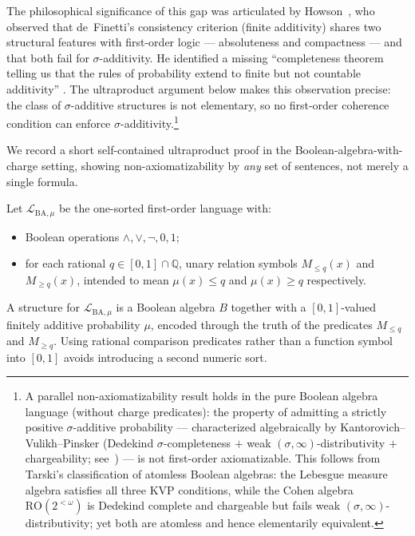 \documentclass[11pt]{article}
\theoremstyle{definition}
\newcommand{\Lmu}{\mathcal{L}_{\mathrm{BA},\mu}}
\begin{document}
The philosophical significance of this gap was articulated by
Howson~\cite{Howson2008}, who observed that de~Finetti's consistency criterion
(finite additivity) shares two structural features with first-order
logic --- absoluteness and compactness --- and that both fail for
$\sigma$-additivity.  He identified a missing ``completeness theorem telling us
that the rules of probability extend to finite but not countable additivity''
\cite[p.~17]{Howson2008}.  The ultraproduct argument below makes this
observation precise: the class of $\sigma$-additive structures is not
elementary, so no first-order coherence condition can enforce
$\sigma$-additivity.\footnote{A parallel non-axiomatizability result holds in the
pure Boolean algebra language (without charge predicates): the property of
admitting a strictly positive $\sigma$-additive probability --- characterized
algebraically by Kantorovich--Vulikh--Pinsker (Dedekind $\sigma$-completeness $+$
weak $(\sigma,\infty)$-distributivity $+$ chargeability;
see~\cite[391D]{Fremlin3}) --- is not first-order axiomatizable.  This follows
from Tarski's classification of atomless Boolean algebras: the Lebesgue measure
algebra satisfies all three KVP conditions, while the Cohen algebra
$\mathrm{RO}(2^{<\omega})$ is Dedekind complete and chargeable but fails weak
$(\sigma,\infty)$-distributivity; yet both are atomless and hence elementarily
equivalent.}

We record a short self-contained ultraproduct proof in the
Boolean-algebra-with-charge setting, showing non-axiomatizability by \emph{any}
set of sentences, not merely a single formula.

\medskip

Let $\Lmu$ be the one-sorted first-order language with:
\begin{itemize}
  \item Boolean operations $\wedge, \vee, \neg, 0, 1$;
  \item for each rational $q \in [0,1] \cap \mathbb{Q}$, unary relation symbols
        $M_{\leq q}(x)$ and $M_{\geq q}(x)$, intended to mean
        $\mu(x) \leq q$ and $\mu(x) \geq q$ respectively.
\end{itemize}

A structure for $\Lmu$ is a Boolean algebra $B$ together with a $[0,1]$-valued finitely
additive probability $\mu$, encoded through the truth of the predicates $M_{\leq q}$
and $M_{\geq q}$.  Using rational comparison predicates rather than a function symbol
into $[0,1]$ avoids introducing a second numeric sort.
\end{document}
